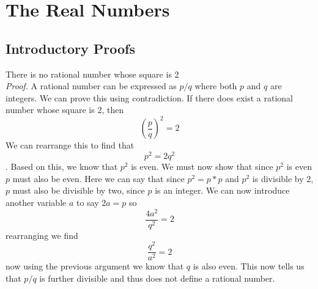 \chapter{The Real Numbers}
\section{Introductory Proofs}
\begin{theorem}
There is no rational number whose square is 2 \\
\textit{Proof.} A rational number can be expressed as $ p/q $ where both $ p $ and $ q $ are integers. We can prove this using contradiction. If there does exist a rational number whose square is 2, then $$ \left(\dfrac{p}{q}\right)^2 = 2$$ We can rearrange this to find that \[ p^2 = 2 q^2 \]. Based on this, we know that $ p^2 $ is even. We must now show that since $ p^2 $ is even $ p $ must also be even. Here we can say that since $ p^2 = p * p $ and $ p^2 $ is divisible by 2, $ p $ must also be divisible by two, since $ p $ is an integer. We can now introduce another variable $ a $ to say $ 2a = p $ so \[ \dfrac{4a^2}{q^2} = 2 \] rearranging we find 
\[ \dfrac{q^2}{a^2} = 2 \] now using the previous argument we know that $ q $ is also even. This now tells us that $ p/q $ is further divisible and thus does not define a rational number.  
\end{theorem} 																		 												